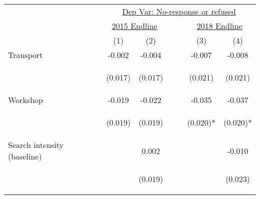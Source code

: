 \begin{tabular}{lcccccc}
\hline \noalign{\smallskip} & \multicolumn{6}{c}{\underline{Dep Var: No-response or refused }}  \\

& \multicolumn{2}{c}{\underline{2015 Endline}} & && \multicolumn{2}{c}{\underline{2018 Endline}} \\
 & (1) & (2) &  &  & (3) & (4)  \\
\noalign{\smallskip}\hline \noalign{\smallskip}Transport & -0.002 & -0.004 &  &  & -0.007 & -0.008\\
 & \begin{footnotesize}(0.017)\end{footnotesize} & \begin{footnotesize}(0.017)\end{footnotesize} & \begin{footnotesize}\end{footnotesize} & \begin{footnotesize}\end{footnotesize} & \begin{footnotesize}(0.021)\end{footnotesize} & \begin{footnotesize}(0.021)\end{footnotesize}\\
\noalign{\smallskip}Workshop & -0.019 & -0.022 &  & & -0.035 & -0.037\\
 & \begin{footnotesize}(0.019)\end{footnotesize} & \begin{footnotesize}(0.019)\end{footnotesize} & \begin{footnotesize}\end{footnotesize} & \begin{footnotesize}\end{footnotesize} & \begin{footnotesize}(0.020)*\end{footnotesize} & \begin{footnotesize}(0.020)*\end{footnotesize}\\
\noalign{\smallskip}Search intensity (baseline) &  & 0.002 &  &  &  & -0.010\\
 & \begin{footnotesize}\end{footnotesize} & \begin{footnotesize}(0.019)\end{footnotesize} & \begin{footnotesize}\end{footnotesize} & \begin{footnotesize}\end{footnotesize} & \begin{footnotesize}\end{footnotesize} & \begin{footnotesize}(0.023)\end{footnotesize}\\

\end{tabular}
